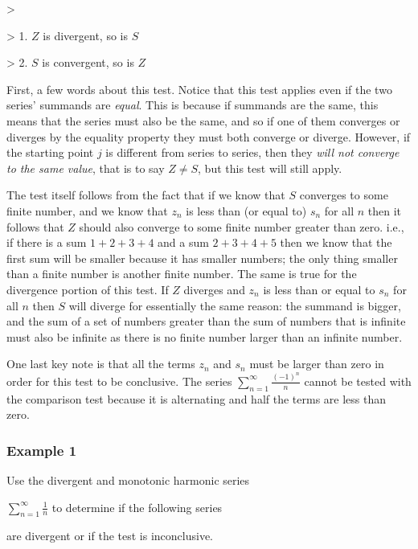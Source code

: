 >

> 1.  $Z$ is divergent, so is $S$

> 2.  $S$ is convergent, so is $Z$


First, a few words about this test. Notice that this test applies even if the two series' summands are \textit{equal}. This is because if summands are the same, this means that the series must also be the same, and so if one of them converges or diverges by the equality property they must both converge or diverge. However, if the starting point $j$ is different from series to series, then they \textit{will not converge to the same value}, that is to say $Z \neq S$, but this test will still apply.


The test itself follows from the fact that if we know that $S$ converges to some finite number, and we know that $z_n$ is less than (or equal to) $s_n$ for all $n$ then it follows that $Z$ should also converge to some finite number greater than zero. i.e., if there is a sum $1+2+3+4$ and a sum $2+3+4+5$ then we know that the first sum will be smaller because it has smaller numbers; the only thing smaller than a finite number is another finite number. The same is true for the divergence portion of this test. If $Z$ diverges and $z_n$ is less than or equal to $s_n$ for all $n$ then $S$ will diverge for essentially the same reason: the summand is bigger, and the sum of a set of numbers greater than the sum of numbers that is infinite must also be infinite as there is no finite number larger than an infinite number.


One last key note is that all the terms $z_n$ and $s_n$ must be larger than zero in order for this test to be conclusive. The series $\sum _{n=1}^{\infty}{\frac{(-1)^n}{n}}$ cannot be tested with the comparison test because it is alternating and half the terms are less than zero.


\subsubsection{Example 1}
\label{sss:exam-acc3}


Use the divergent and monotonic harmonic series

$\sum _{n=1}^{\infty}{\frac{1}{n}}$ to determine if the following series

are divergent or if the test is inconclusive.


